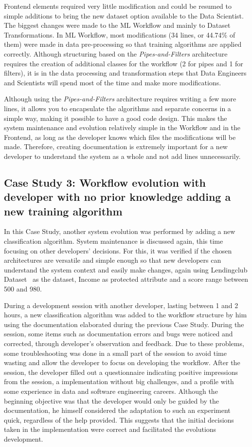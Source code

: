 \documentclass[sigconf]{acmart}
\begin{document}
Frontend elements required very little modification and could be resumed to simple additions to bring the new dataset option available to the Data Scientist. The biggest changes were made to the ML Workflow and mainly to Dataset Transformations. In ML Workflow, most modifications (34 lines, or 44.74\% of them) were made in data pre-processing so that training algorithms are applied correctly. Although structuring based on the \textit{Pipes-and-Filters} architecture requires the creation of additional classes for the workflow (2 for pipes and 1 for filters), it is in the data processing and transformation steps that Data Engineers and Scientists will spend most of the time and make more modifications.

Although using the \textit{Pipes-and-Filters} architecture requires writing a few more lines, it allows you to encapsulate the algorithms and separate concerns in a simple way, making it possible to have a good code design. This makes the system maintenance and evolution relatively simple in the Workflow and in the Frontend, as long as the developer knows which files the modifications will be made. Therefore, creating documentation is extremely important for a new developer to understand the system as a whole and not add lines unnecessarily.

\subsection{Case Study 3: Workflow evolution with developer with no prior knowledge adding a new training algorithm}

In this Case Study, another system evolution was performed by adding a new classification algorithm. System maintenance is discussed again, this time focusing on other developers' decisions. For this, it was verified if the chosen architectures are versatile and simple enough so that new developers can understand the system context and easily make changes, again using Lendingclub Dataset~\citep{lendingclub_2022} as the dataset, Income as protected attribute and a score range between 500 and 980.

During a development session with another developer, lasting between 1 and 2 hours, a new classification algorithm was added to the workflow structure by him using the documentation elaborated during the previous Case Study. During the session, some items such as documentation errors and bugs were noticed and corrected, through developer's observation and feedback. Due to these problems, some troubleshooting was done in a small part of the session to avoid time wasting and allow the developer to focus on developing the workflow. After the session, the developer filled out a questionnaire indicating positive impressions from the session, a implementation without big challenges, and a profile with some experience in data and software engineering careers. Although the beginning objective was that the developer would only be guided by the documentation, he himself considered the adaptation to such an experiment quick, regardless of the help provided. This suggests that the initial decisions taken in the implementation were correct and facilitated the evolutions development.
\end{document}

